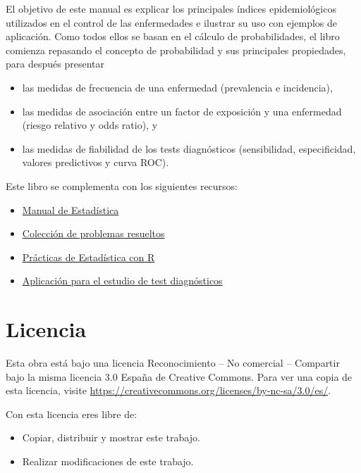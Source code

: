 \documentclass[
  spanish,
  a4paper,
]{scrreport}
\providecommand{\tightlist}{%
  \setlength{\itemsep}{0pt}\setlength{\parskip}{0pt}}
\theoremstyle{definition}
\theoremstyle{definition}
\theoremstyle{remark}
\begin{document}
El objetivo de este manual es explicar los principales índices
epidemiológicos utilizados en el control de las enfermedades e ilustrar
su uso con ejemplos de aplicación. Como todos ellos se basan en el
cálculo de probabilidades, el libro comienza repasando el concepto de
probabilidad y sus principales propiedades, para después presentar

\begin{itemize}
\tightlist
\item
  las medidas de frecuencia de una enfermedad (prevalencia e
  incidencia),
\item
  las medidas de asociación entre un factor de exposición y una
  enfermedad (riesgo relativo y odds ratio), y
\item
  las medidas de fiabilidad de los tests diagnósticos (sensibilidad,
  especificidad, valores predictivos y curva ROC).
\end{itemize}

Este libro se complementa con los siguientes recursos:

\begin{itemize}
\tightlist
\item
  \href{https://aprendeconalf.es/estadistica-manual/}{Manual de
  Estadística}
\item
  \href{https://aprendeconalf.es/estadistica-ejercicios/}{Colección de
  problemas resueltos}
\item
  \href{https://aprendeconalf.es/estadistica-practicas-r/}{Prácticas de
  Estadística con R}
\item
  \href{http://nube.aprendeconalf.es/shiny/diagnostic-test/}{Aplicación
  para el estudio de test diagnósticos}
\end{itemize}

\section*{Licencia}\label{licencia}


Esta obra está bajo una licencia Reconocimiento -- No comercial --
Compartir bajo la misma licencia 3.0 España de Creative Commons. Para
ver una copia de esta licencia, visite
\url{https://creativecommons.org/licenses/by-nc-sa/3.0/es/}.

Con esta licencia eres libre de:

\begin{itemize}
\tightlist
\item
  Copiar, distribuir y mostrar este trabajo.
\item
  Realizar modificaciones de este trabajo.
\end{itemize}
\end{document}
